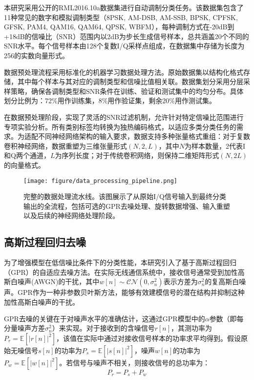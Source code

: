 \documentclass[conference]{IEEEtran}
\begin{document}
本研究采用公开的RML2016.10a数据集进行自动调制分类任务。该数据集包含了11种常见的数字和模拟调制类型（8PSK, AM-DSB, AM-SSB, BPSK, CPFSK, GFSK, PAM4, QAM16, QAM64, QPSK, WBFM），每种调制方式在-20dB到+18dB的信噪比（SNR）范围内以2dB为步长生成信号样本，总共涵盖20个不同的SNR水平。每个信号样本由128个复数I/Q采样点组成，在数据集中存储为长度为256的实数向量形式。

数据预处理流程采用标准化的机器学习数据处理方法。原始数据集以结构化格式存储，其中每个样本与其对应的调制类型和信噪比值相关联。数据集划分采用分层采样策略，确保各调制类型和SNR条件在训练、验证和测试集中的均匀分布。具体划分比例为：72\%用作训练集，8\%用作验证集，剩余20\%用作测试集。

在数据预处理阶段，实现了灵活的SNR过滤机制，允许针对特定信噪比范围进行专项实验分析。所有类别标签均转换为独热编码格式，以适应多类分类任务的需求。为适配不同神经网络架构的输入要求，数据支持多种张量格式重组：对于复数卷积神经网络，数据重塑为三维张量形式$(N, 2, L)$，其中$N$为样本数量，2代表I和Q两个通道，$L$为序列长度；对于传统卷积网络，则保持二维矩阵形式$(N, 2L)$的向量格式。

\begin{figure*}[htbp]
\centering
\texttt{[image: figure/data\_processing\_pipeline.png]}
\caption{完整的数据处理流水线。该图展示了从原始I/Q信号输入到最终分类输出的全流程，包括可选的GPR去噪处理、旋转数据增强、输入重塑以及后续的神经网络处理阶段。}
\label{fig:data_pipeline}
\end{figure*}

\subsection{高斯过程回归去噪}

为了增强模型在低信噪比条件下的分类性能，本研究引入了基于高斯过程回归（GPR）的自适应去噪方法。在实际无线通信系统中，接收信号通常受到加性高斯白噪声(AWGN)的干扰，其中$w[n] \sim \mathcal{CN}(0, \sigma_n^2)$表示方差为$\sigma_n^2$的复高斯白噪声。GPR作为一种非参数贝叶斯方法，能够有效建模信号的潜在结构并抑制这种加性高斯白噪声的干扰。

GPR去噪的关键在于对噪声水平的准确估计，这通过GPR模型中的$\alpha$参数（即每分量噪声方差$\sigma_n^2$）来实现。对于接收到的含噪信号$r[n]$，其测功率为$P_r = \mathbb{E}[|r[n]|^2]$，该值在实际中通过对接收信号样本的功率求平均得到。假设原始无噪信号$s[n]$的功率为$P_s = \mathbb{E}[|s[n]|^2]$，噪声$w[n]$的功率为$P_w = \mathbb{E}[|w[n]|^2]$。若信号与噪声不相关，则接收信号的总功率为：
\begin{equation}
P_r = P_s + P_w
\end{equation}
\end{document}
